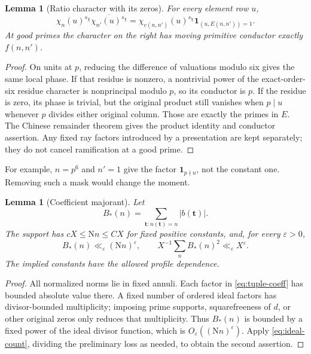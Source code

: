 \documentclass[11pt]{article}
\newtheorem{lemma}[theorem]{Lemma}
\theoremstyle{definition}
\theoremstyle{remark}
\numberwithin{equation}{section}
\newcommand{\Nm}{\mathrm N}
\newcommand{\ind}{\mathbf1}
\newcommand{\ee}{\varepsilon}
\newcommand{\st}{\boldsymbol t}
\newcommand{\conj}[1]{\overline{#1}}
\begin{document}
\begin{lemma}[Ratio character with its zeros]\label{lem:ratio}
For every element row $u$,
\begin{equation}\label{eq:ratio-identity}
\chi_n(u)^{s_\chi}\conj{\chi_{n'}(u)^{s_\chi}}
=\chi_{c(n,n')}(u)^{s_\chi}\ind_{(u,E(n,n'))=1}.
\end{equation}
At good primes the character on the right has moving primitive
conductor exactly $f(n,n')$.
\end{lemma}
\begin{proof}
On units at $p$, reducing the difference of valuations modulo six
gives the same local phase. If that residue is nonzero, a nontrivial
power of the exact-order-six residue character is nonprincipal modulo
$p$, so its conductor is $p$. If the residue is zero, its phase is
trivial, but the original product still vanishes when $p\mid u$
whenever $p$ divides either original column. Those are exactly the
primes in $E$. The Chinese remainder theorem gives the product
identity and conductor assertion. Any fixed ray factors introduced
by a presentation are kept separately; they do not cancel ramification
at a good prime.
\end{proof}

For example, $n=p^6$ and $n'=1$ give the factor $\ind_{p\nmid u}$,
not the constant one. Removing such a mask would change the moment.

\begin{lemma}[Coefficient majorant]\label{lem:coeff}
Let
\[
B_*(n)=\sum_{\st:n(\st)=n}|b(\st)|.
\]
The support has $cX\le\Nm n\le CX$ for fixed positive constants,
and, for every $\ee>0$,
\begin{equation}\label{eq:coeff-bound}
B_*(n)\ll_\ee(\Nm n)^\ee,\qquad
X^{-1}\sum_n B_*(n)^2\ll_\ee X^\ee.
\end{equation}
The implied constants have the allowed profile dependence.
\end{lemma}
\begin{proof}
All normalized norms lie in fixed annuli. Each factor in
\eqref{eq:tuple-coeff} has bounded absolute value there. A fixed number
of ordered ideal factors has divisor-bounded multiplicity; imposing
prime supports, squarefreeness of $d$, or other original zeros only
reduces that multiplicity. Thus $B_*(n)$ is bounded by a fixed power
of the ideal divisor function, which is $O_\ee((\Nm n)^\ee)$.
Apply \eqref{eq:ideal-count}, dividing the preliminary loss as needed,
to obtain the second assertion.
\end{proof}
\end{document}
